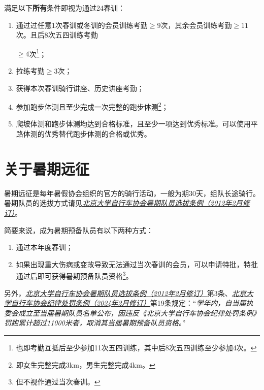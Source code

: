 \documentclass[UTF8]{ctexart}
\begin{document}
满足以下\textbf{所有}条件即视为通过24春训：
\begin{enumerate}[nosep,left=4em]
    \item 通过过任意1次春训或冬训的会员训练考勤$\ge 9$次，其余会员训练考勤$\ge 11$次。且后8次五四训练考勤
    
    $\ge 4$次\footnote{也即考勤互抵后至少参加11次五四训练，其中后8次五四训练至少参加4次。}；
    \item 拉练考勤$\ge 3$次；
    \item 获得本次春训骑行讲座、历史讲座考勤；
    \item 参加跑步体测且至少完成一次完整的跑步体测\footnote{即女生完整完成3km，男生完整完成4km。}；
    \item 爬坡体测和跑步体测均达到合格标准，且至少一项达到优秀标准。可以使用平路体测的优秀替代跑步体测的合格或优秀。
\end{enumerate}

\section{关于暑期远征}

暑期远征是每年暑假协会组织的官方的骑行活动，一般为期30天，组队长途骑行。暑期队员的选拔方式请见\href{https://chexie.net/bbs/content/?bid=1&tid=9610&p=1}{\textit{北京大学自行车协会暑期队员选拔条例（2012年2月修订）}}。

简要来说，成为暑期预备队员有以下两种方式：
\begin{enumerate}[nosep,left=4em]
    \item 通过本年度春训；
    \item 如果出现重大伤病或变故导致无法通过当次春训的会员，可以申请特批，特批通过后即可获得暑期预备队员资格\footnote{但不视作通过当次春训。}。
\end{enumerate}

另外，\href{https://chexie.net/bbs/content/?bid=1&tid=9610&p=1}{\textit{北京大学自行车协会暑期队员选拔条例（2012年2月修订）}}第3条、\href{https://chexie.net/bbs/content/?bid=1&tid=9751&p=1}{\textit{北京大学自行车协会纪律处罚条例（2024年2月修订）}}第19条规定：“\textit{学年内，自当届执委会成立至当届暑期队员名单公布，因违反《北京大学自行车协会纪律处罚条例》罚跑累计超过11000米者，取消其当届暑期预备队员资格。}”


\end{document}
